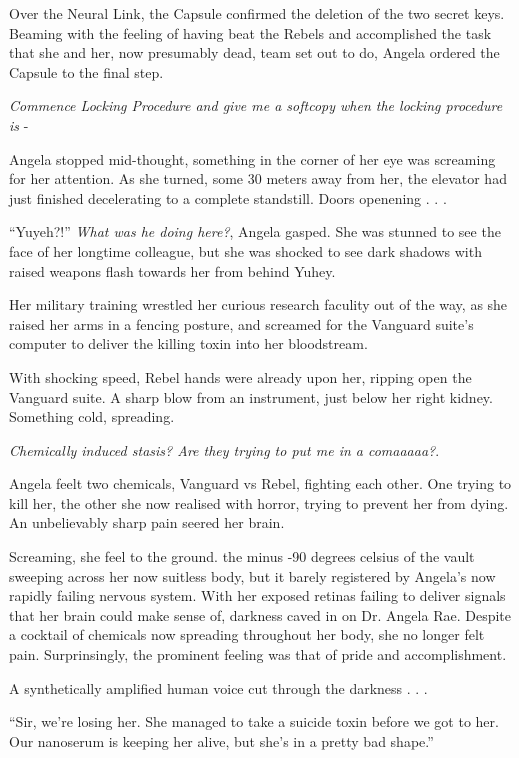 \documentclass[smalldemyvopaper,11pt,twoside,onecolumn,openright,extrafontsizes]{memoir}
\begin{document}
 
  Over the Neural Link, the Capsule confirmed the deletion of the two secret keys. Beaming with the feeling of having beat the Rebels and accomplished the task that she and her, now presumably dead, team set out to do, Angela ordered the Capsule to the final step.

 
  \textit{Commence Locking Procedure and give me a softcopy when the locking procedure is} -

 
  Angela stopped mid-thought, something in the corner of her eye was screaming for her attention. As she turned, some 30 meters away from her, the elevator had just finished decelerating to a complete standstill. Doors openening . . .

 
  “Yuyeh?!” \textit{What was he doing here?}, Angela gasped. She was stunned to see the face of her longtime colleague, but she was shocked to see dark shadows with raised weapons flash towards her from behind Yuhey.

 Her military training wrestled her curious research faculity out of the way, as she raised her arms in a fencing posture, and screamed for the Vanguard suite’s computer to deliver the killing toxin into her bloodstream. 

 
 With shocking speed, Rebel hands were already upon her, ripping open the Vanguard suite. A sharp blow from an instrument, just below her right kidney. Something cold, spreading.

 
  \textit{Chemically induced stasis? Are they trying to put me in a comaaaaa?}.

 
  Angela feelt two chemicals, Vanguard vs Rebel, fighting each other. One trying to kill her, the other she now realised with horror, trying to prevent her from dying. An unbelievably sharp pain seered her brain.

 Screaming, she feel to the ground. the minus -90 degrees celsius of the vault sweeping across her now suitless body, but it barely registered by Angela’s now rapidly failing nervous system. With her exposed retinas failing to deliver signals that her brain could make sense of, darkness caved in on Dr. Angela Rae. Despite a cocktail of chemicals now spreading throughout her body, she no longer felt pain. Surprinsingly, the prominent feeling was that of pride and accomplishment.

 
 A synthetically amplified human voice cut through the darkness . . .

 
  “Sir, we’re losing her. She managed to take a suicide toxin before we got to her. Our nanoserum is keeping her alive, but she’s in a pretty bad shape.”
\end{document}
